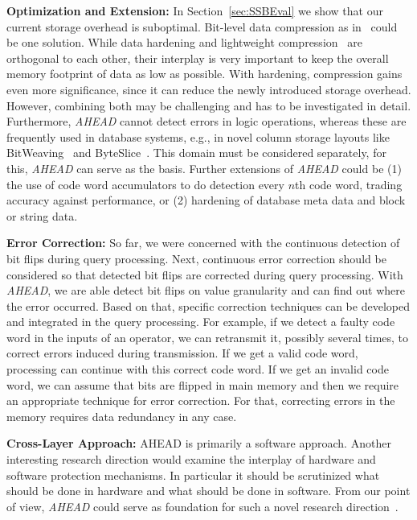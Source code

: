 \textbf{Optimization and Extension:} In Section~\ref{sec:SSBEval} we show that our current storage overhead is suboptimal. Bit-level data compression as in~\cite{Willhalm:2009:SUF:1687627.1687671,willhalm2013vectorizing} could be one solution. While data hardening and lightweight compression~\cite{DBLP:conf/sigmod/AbadiMF06,DBLP:conf/edbt/DammeHHL17} are orthogonal to each other, their interplay is very important to keep the overall memory footprint of data as low as possible. With hardening, compression gains even more significance, since it can reduce the newly introduced storage overhead. However, combining both may be challenging and has to be investigated in detail. Furthermore, \emph{AHEAD} cannot detect errors in logic operations, whereas these are frequently used in database systems, e.g., in novel column storage layouts like BitWeaving~\cite{Li:2013:BFS:2463676.2465322} and ByteSlice~\cite{Feng:2015:BPE:2723372.2747642}. This domain must be considered separately, for this, \emph{AHEAD} can serve as the basis. Further extensions of \emph{AHEAD} could be (1) the use of code word accumulators to do detection every \(n\)th code word, trading accuracy against performance, or (2) hardening of database meta data and block or string data. %


\textbf{Error Correction:} So far, we were concerned with the continuous detection of bit flips during query processing. Next, continuous error correction should be considered so that detected bit flips are corrected during query processing. With \emph{AHEAD}, we are able detect bit flips on value granularity and can find out where the error occurred. Based on that, specific correction techniques can be developed and integrated in the query processing. For example, if we detect a faulty code word in the inputs of an operator, we can retransmit it, possibly several times, to correct errors induced during transmission. If we get a valid code word, processing can continue with this correct code word. If we get an invalid code word, we can assume that bits are flipped in main memory and then we require an appropriate technique for error correction. For that, correcting errors in the memory requires data redundancy in any case. %

\textbf{Cross-Layer Approach:} AHEAD is primarily a software approach. Another interesting research direction would examine the interplay of hardware and software protection mechanisms. In particular it should be scrutinized what should be done in hardware and what should be done in software. From our point of view, \emph{AHEAD} could serve as foundation for such a novel research direction~\cite{DBLP:books/daglib/0037372}.

